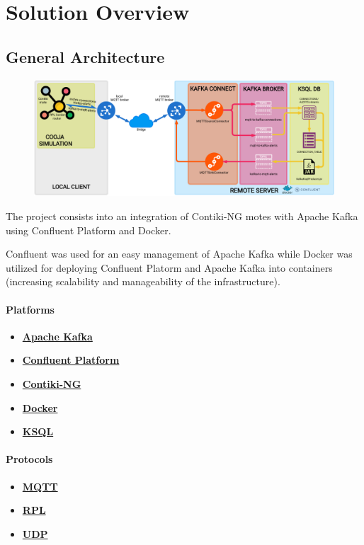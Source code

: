 \documentclass[table, 12pt]{article}
\begin{document}
\section{Solution Overview}

\subsection{General Architecture}

\begin{figure}[!ht]
    \centering
    \includegraphics[width=\textwidth]{assets/middleware.pdf}
\end{figure}

The project consists into an integration of Contiki-NG motes with Apache Kafka using Confluent Platform and Docker.

Confluent was used for an easy management of Apache Kafka while Docker was utilized for deploying Confluent Platorm and Apache Kafka into containers (increasing scalability and manageability of the infrastructure).
\newpage
\paragraph{Platforms}
\begin{itemize}
    \item \href{https://kafka.apache.org/}{\textbf{Apache Kafka}}
    \item \href{https://docs.confluent.io/platform/current/overview.html}{\textbf{Confluent Platform}}
    \item \href{https://www.contiki-ng.org/}{\textbf{Contiki-NG}}
    \item \href{https://www.docker.com/}{\textbf{Docker}}
    \item \href{https://www.confluent.io/product/ksql/}{\textbf{KSQL}}
\end{itemize}

\paragraph{Protocols}
\begin{itemize}
    \item \href{https://mqtt.org/}{\textbf{MQTT}}
    \item \href{https://tools.ietf.org/html/rfc6550}{\textbf{RPL}}
    \item \href{https://www.rfc-editor.org/ien/ien71.pdf}{\textbf{UDP}}
\end{itemize}
\end{document}
